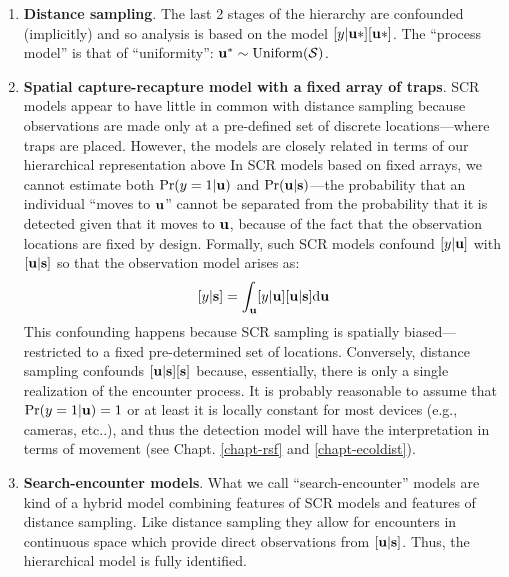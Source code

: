 \begin{enumerate}
\item {\bf Distance sampling}. The last 2 stages of the hierarchy
  are confounded (implicitly) and so analysis is based on the model
  $[y|{\bf u}*] [{\bf u}*]$. The ``process model'' is that of ``uniformity'': ${\bf u}^{*}
  \sim \text{Uniform}({\cal S})$.

\item {\bf Spatial capture-recapture model with a fixed array of traps}.
SCR models appear to have little in common with distance sampling
because observations are made only at a pre-defined set of discrete
locations---where traps are placed. However, the models are closely
related in terms of our hierarchical representation above
In SCR models based on fixed arrays, we cannot estimate both
$\Pr(y=1|{\bf u})$ and $\Pr({\bf u}|{\bf s})$---the probability that
an individual ``moves to ${\bf u}$'' cannot be separated from the
probability that it is detected given that it moves to ${\bf u}$,
because of the fact that the observation locations are fixed by
design.
Formally, such SCR models confound $[y|{\bf u}]$  with $[{\bf
  u}|{\bf s}]$ so that the observation model arises as:
\[
 [y|{\bf s}] = \int_{\bf u} [y|{\bf u}][{\bf u}|{\bf s}] \mathrm{d}{\bf u}
\]
This confounding happens because SCR sampling is spatially
biased---restricted to a fixed pre-determined set of locations.
Conversely,
distance sampling confounds $[{\bf u}|{\bf s}][{\bf s}]$ because, essentially, there is
only a single realization of the encounter process.
It is probably
reasonable to assume that $\Pr(y=1|{\bf u})=1$ or at least it is locally
constant for most devices (e.g., cameras, etc..), and thus the
detection model will have the interpretation in terms of movement (see
Chapt. \ref{chapt-rsf} and \ref{chapt-ecoldist}).

\item {\bf Search-encounter models}. What we call
  ``search-encounter'' models \citep{royle_young:2008,royle_etal:2011mee}
  are kind of a hybrid model combining features of SCR models and
  features of distance sampling. Like distance sampling they allow for
  encounters in continuous space which provide direct observations
  from $[{\bf u}|{\bf s}]$. Thus, the
  hierarchical model is fully identified.


\end{enumerate}
